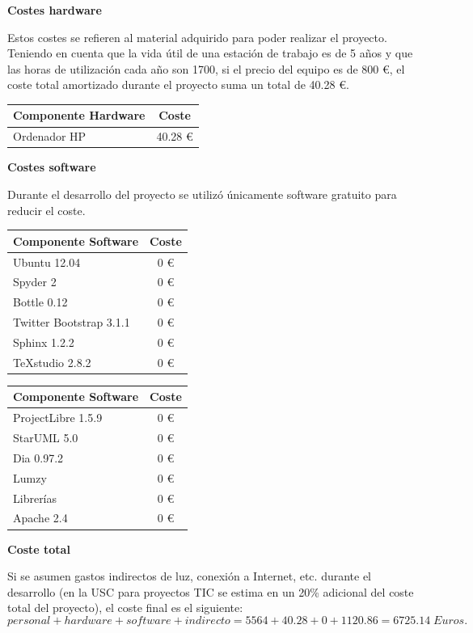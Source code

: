 \noindent
\textbf{Costes hardware}

Estos costes se refieren al material adquirido para poder realizar el proyecto. Teniendo en cuenta que la vida útil de una estación de trabajo es de 5 años y que las horas de utilización cada año son 1700, si el precio del equipo es de 800 \euro, el coste total amortizado durante el proyecto suma un total de 40.28 \euro.

\begin{table}[H]
	\centering
	\begin{tabular}{|l|c|}
		\hline
		\textbf{Componente Hardware} & \textbf{Coste} \\ \hline
		Ordenador HP & 40.28 \euro \\ \hline
	\end{tabular}
\end{table}

\noindent
\textbf{Costes software}

Durante el desarrollo del proyecto se utilizó únicamente software gratuito para reducir el coste.

\begin{table}[H]
	\centering
	\begin{tabular}{|l|c|}
		\hline
		\textbf{Componente Software} & \textbf{Coste} \\ \hline
		Ubuntu 12.04 & 0 \euro \\ \hline
		Spyder 2 & 0 \euro \\ \hline
		Bottle 0.12 & 0 \euro \\ \hline
		Twitter Bootstrap 3.1.1 & 0 \euro \\ \hline
		Sphinx 1.2.2 & 0 \euro \\ \hline
		TeXstudio 2.8.2 & 0 \euro \\ \hline
	\end{tabular}
	\quad
	\begin{tabular}{|l|c|}
		\hline
		\textbf{Componente Software} & \textbf{Coste} \\ \hline
		ProjectLibre 1.5.9 & 0 \euro \\ \hline
		StarUML 5.0 & 0 \euro \\ \hline
		Dia 0.97.2 & 0 \euro \\ \hline
		Lumzy & 0 \euro \\ \hline
		Librerías & 0 \euro \\ \hline
		Apache 2.4 & 0 \euro \\ \hline
	\end{tabular}
\end{table}

\noindent
\textbf{Coste total}

Si se asumen gastos indirectos de luz, conexión a Internet, etc. durante el desarrollo (en la USC para proyectos TIC se estima en un 20\% adicional del coste total del proyecto), el coste final es el siguiente:
\[ personal + hardware + software + indirecto = 5564 + 40.28 + 0 + 1120.86 = 6725.14 \; Euros. \]